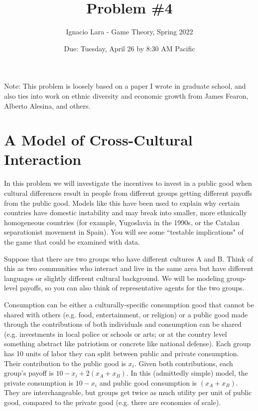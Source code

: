 \documentclass[10pt]{article}
\title{Problem \#4}
\author{Ignacio Lara - Game Theory, Spring 2022}
\date{Due: Tuesday, April 26 by 8:30 AM Pacific}
\begin{document}
\maketitle


Note: This problem is loosely based on a paper I wrote in graduate school, and also ties into work on ethnic diversity and economic growth from James Fearon, Alberto Alesina, and others.

\section*{A Model of Cross-Cultural Interaction}

In this problem we will investigate the incentives to invest in a public good when cultural differences result in people from different groups getting different payoffs from the public good. Models like this have been used to explain why certain countries have domestic instability and may break into smaller, more ethnically homogeneous countries (for example, Yugoslavia in the 1990s, or the Catalan separationist movement in Spain). You will see some ``testable implications" of the game that could be examined with data.

Suppose that there are two groups who have different cultures A and B. Think of this as two communities who interact and live in the same area but have different languages or slightly different cultural background. We will be modeling group-level payoffs, so you can also think of representative agents for the two groups.

Consumption can be either a culturally-specific consumption good that cannot be shared with others (e.g. food, entertainment, or religion) or a public good made through the contributions of both individuals and consumption can be shared (e.g. investments in local police or schools or arts; or at the country level something abstract like patriotism or concrete like national defense). Each group has 10 units of labor they can split between public and private consumption. Their contribution to the public good is $x_i$. Given both contributions, each group's payoff is $10-x_i+2(x_A+x_B)$. In this (admittedly simple) model, the private consumption is $10-x_i$ and public good consumption is $(x_A+x_B)$. They are interchangeable, but groups get twice as much utility per unit of public good, compared to the private good (e.g. there are economies of scale).
\end{document}
